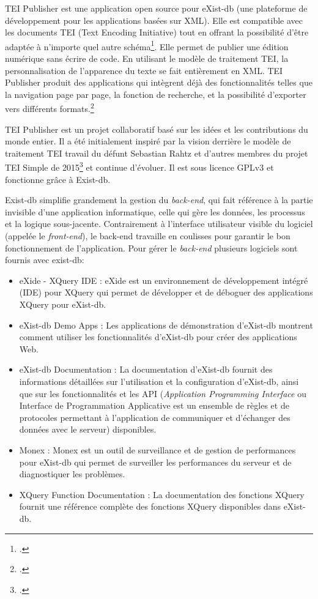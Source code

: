 TEI Publisher est une application open source pour eXist-db (une plateforme de développement pour les applications basées sur XML). Elle est compatible avec les documents TEI (Text Encoding Initiative) tout en offrant la possibilité d'être adaptée à n'importe quel autre schéma\footcite{AtomicWiki}. Elle permet de publier une édition numérique sans écrire de code. En utilisant le modèle de traitement TEI, la personnalisation de l’apparence du texte se fait entièrement en XML. TEI Publisher produit des applications qui intègrent déjà des fonctionnalités telles que la navigation page par page, la fonction de recherche, et la possibilité d'exporter vers différents formats.\footcite{TEIPublisherDocumentation}

TEI Publisher est un projet collaboratif basé sur les idées et les contributions du monde entier. Il a été initialement inspiré par la vision derrière le modèle de traitement TEI \og{}travail du défunt Sebastian Rahtz et d’autres membres du projet TEI Simple de 2015\fg{}\footcite{TEIPublisher} et continue d’évoluer. Il est sous licence GPLv3 et fonctionne grâce à Exist-db.

Exist-db simplifie grandement la gestion du \textit{back-end}, qui fait référence à la partie invisible d'une application informatique, celle qui gère les données, les processus et la logique sous-jacente. Contrairement à l'interface utilisateur visible du logiciel (appelée le \textit{front-end}), le back-end travaille en coulisses pour garantir le bon fonctionnement de l'application. Pour gérer le \textit{back-end} plusieurs logiciels sont fournis avec exist-db:

\begin{itemize}[label=\textbullet]
    \item eXide - XQuery IDE : eXide est un environnement de développement intégré (IDE) pour XQuery qui permet de développer et de déboguer des applications XQuery pour eXist-db.
    \item eXist-db Demo Apps : Les applications de démonstration d’eXist-db montrent comment utiliser les fonctionnalités d’eXist-db pour créer des applications Web.
    \item eXist-db Documentation : La documentation d’eXist-db fournit des informations détaillées sur l’utilisation et la configuration d’eXist-db, ainsi que sur les fonctionnalités et les API (\textit{Application Programming Interface} ou \og{}Interface de Programmation Applicative\fg{} est un ensemble de règles et de protocoles permettant à l'application de communiquer et d'échanger des données avec le serveur) disponibles.
    \item Monex : Monex est un outil de surveillance et de gestion de performances pour eXist-db qui permet de surveiller les performances du serveur et de diagnostiquer les problèmes.
    \item XQuery Function Documentation : La documentation des fonctions XQuery fournit une référence complète des fonctions XQuery disponibles dans eXist-db.
\end{itemize}

